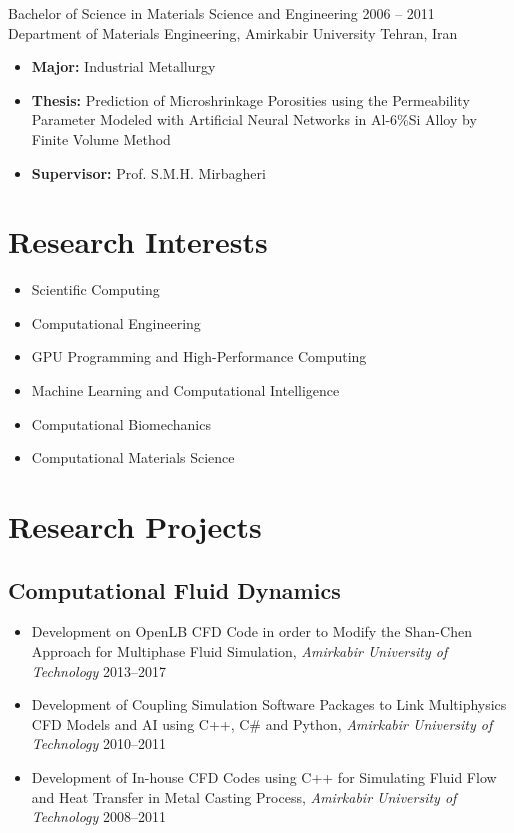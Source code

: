 \documentclass{cv}
\begin{document}
\longdatedsubsection
{Bachelor of Science in Materials Science and Engineering}
{2006 -- 2011} 
{Department of Materials Engineering, Amirkabir University} 
{Tehran, Iran} 

\begin{itemize}

\item 
\textbf{Major:} Industrial Metallurgy

\item
\textbf{Thesis:} Prediction of Microshrinkage Porosities using the Permeability Parameter Modeled with Artificial Neural Networks in Al-6\%Si Alloy by Finite Volume Method

\item
\textbf{Supervisor:} Prof. S.M.H. Mirbagheri


\end{itemize}


\section{Research Interests}

\begin{itemize}
\item
Scientific Computing
\item
Computational Engineering
\item
GPU Programming and High-Performance Computing
\item
Machine Learning and Computational Intelligence
\item
Computational Biomechanics
\item
Computational Materials Science
\end{itemize}


\section{Research Projects}

\subsection{Computational Fluid Dynamics}

\begin{itemize}
\item
Development on OpenLB CFD Code in order to Modify the Shan-Chen Approach for Multiphase Fluid Simulation, \textit{Amirkabir University of Technology} \hfill 2013--2017
\item
Development of Coupling Simulation Software Packages to Link Multiphysics CFD Models and AI using C++, C\# and Python, \textit{Amirkabir University of Technology} \hfill 2010--2011
\item
Development of In-house CFD Codes using C++ for Simulating Fluid Flow and Heat Transfer in Metal Casting Process, \textit{Amirkabir University of Technology} \hfill 2008--2011
\end{itemize}
\end{document}
